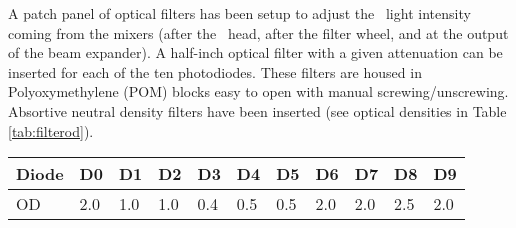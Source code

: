 A patch panel of optical filters has been setup to adjust the \laser~light intensity coming from the mixers (after the \laser~head, after the filter wheel, and at the output of the beam expander). A half-inch optical filter with a given attenuation can be inserted  for each of the ten photodiodes. These filters are housed in Polyoxymethylene (POM) blocks easy to open with manual screwing/unscrewing. Absortive neutral density filters \cite{ref:filters} have been inserted (see optical densities in Table \ref{tab:filterod}).

\begin{table*}[!htpb]
 \begin{center}
\caption{Optical Density (OD) of the optical filters on the \laser~light path to the photodiodes.}\label{tab:filterod}
\begin{tabular}{lllllllllll}
\hline
Diode & D0 & D1 & D2 & D3 & D4 & D5 & D6 & D7 & D8 & D9 \\
\hline
OD & 2.0 & 1.0 & 1.0 & 0.4 & 0.5 & 0.5 & 2.0 & 2.0 & 2.5 & 2.0\\ 
\hline
\end{tabular}
\end{center}
\end{table*}

